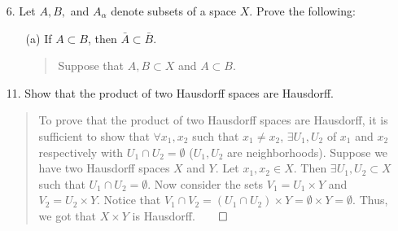 \documentclass[12pt, a4paper]{article}
\begin{document}
\begin{itemize}
\item[]
\item[]

\item[6.]
Let $A, B,$ and $A_\alpha$ denote subsets of a space $X$. Prove the following:
\begin{itemize}
\item[(a)]
If $A \subset B$, then $\bar{A} \subset \bar{B}$.
\begin{quote}
Suppose that $A, B \subset X$ and $A \subset B$.
\end{quote}
\end{itemize}

\item[]
\item[]

\item[11.]
Show that the product of two Hausdorff spaces are Hausdorff.
\begin{quote}
To prove that the product of two Hausdorff spaces are Hausdorff,
it is sufficient to show that $\forall x_1, x_2$ such that $x_1 \neq x_2$,
$\exists U_1, U_2$ of $x_1$ and $x_2$ respectively with $U_1 \cap U_2 = \emptyset$ ($U_1, U_2$ are neighborhoods).
Suppose we have two Hausdorff spaces $X$ and $Y$.
Let $x_1, x_2 \in X$. Then $\exists U_1, U_2 \subset X$
such that $U_1 \cap U_2 = \emptyset$. Now consider the sets
$V_1 = U_1 \times Y$ and $V_2 = U_2 \times Y$. Notice that
$V_1 \cap V_2 = (U_1 \cap U_2) \times Y = \emptyset \times Y = \emptyset$.
Thus, we got that $X \times Y$ is Hausdorff.$\qed$
\end{quote}

\item[]
\item[]


\end{itemize}
\end{document}

